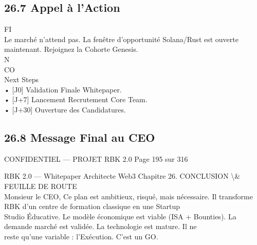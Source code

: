 \subsection{26.7 Appel à l’Action}
\vspace{0.5em}
\vspace{0.5em}
\vspace{0.5em}
FI\\
Le marché n’attend pas. La fenêtre d’opportunité Solana/Rust est ouverte maintenant. Rejoignez la Cohorte Genesis.\\
N\\
CO\\
Next Steps\\
\vspace{0.5em}
• [J0] Validation Finale Whitepaper.\\
\vspace{0.5em}
• [J+7] Lancement Recrutement Core Team.\\
\vspace{0.5em}
• [J+30] Ouverture des Candidatures.\\
\vspace{0.5em}
\vspace{0.5em}
\vspace{0.5em}
\subsection{26.8 Message Final au CEO}
\vspace{0.5em}
\vspace{0.5em}
\vspace{0.5em}
\begin{confidential}CONFIDENTIEL — PROJET RBK 2.0                               Page 195 sur 316\end{confidential}
RBK 2.0 — Whitepaper Architecte Web3                                                      Chapitre 26. CONCLUSION \textbackslash{}& FEUILLE DE ROUTE\\
\vspace{0.5em}
\vspace{0.5em}
\vspace{0.5em}
Monsieur le CEO, Ce plan est ambitieux, risqué, mais nécessaire. Il transforme RBK d’un centre de formation classique en une Startup\\
Studio Éducative. Le modèle économique est viable (ISA + Bounties). La demande marché est validée. La technologie est mature. Il ne\\
reste qu’une variable : l’Exécution. C’est un GO.\\
\vspace{0.5em}
\vspace{0.5em}

